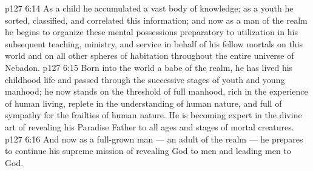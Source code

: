\vs p127 6:14 As a child he accumulated a vast body of knowledge; as a youth he sorted, classified, and correlated this information; and now as a man of the realm he begins to organize these mental possessions preparatory to utilization in his subsequent teaching, ministry, and service in behalf of his fellow mortals on this world and on all other spheres of habitation throughout the entire universe of Nebadon.
\vs p127 6:15 Born into the world a babe of the realm, he has lived his childhood life and passed through the successive stages of youth and young manhood; he now stands on the threshold of full manhood, rich in the experience of human living, replete in the understanding of human nature, and full of sympathy for the frailties of human nature. He is becoming expert in the divine art of revealing his Paradise Father to all ages and stages of mortal creatures.
\vs p127 6:16 And now as a full\hyp{}grown man --- an adult of the realm --- he prepares to continue his supreme mission of revealing God to men and leading men to God.
\quizlink
